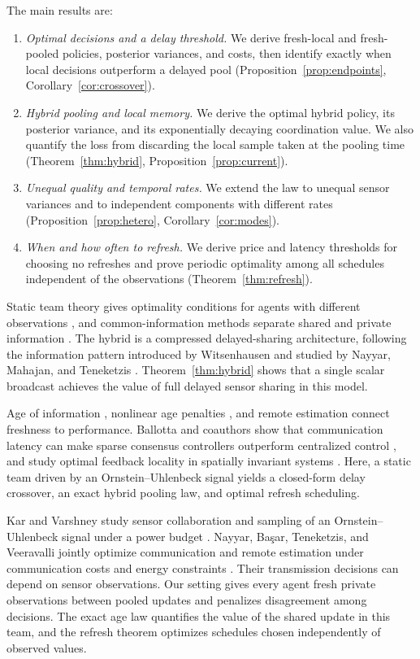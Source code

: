 \documentclass[letterpaper,10pt,conference]{ieeeconf}
\begin{document}
The main results are:
\begin{enumerate}
\item \emph{Optimal decisions and a delay threshold.} We derive fresh-local and fresh-pooled policies, posterior variances, and costs, then identify exactly when local decisions outperform a delayed pool (Proposition~\ref{prop:endpoints}, Corollary~\ref{cor:crossover}).
\item \emph{Hybrid pooling and local memory.} We derive the optimal hybrid policy, its posterior variance, and its exponentially decaying coordination value. We also quantify the loss from discarding the local sample taken at the pooling time (Theorem~\ref{thm:hybrid}, Proposition~\ref{prop:current}).
\item \emph{Unequal quality and temporal rates.} We extend the law to unequal sensor variances and to independent components with different rates (Proposition~\ref{prop:hetero}, Corollary~\ref{cor:modes}).
\item \emph{When and how often to refresh.} We derive price and latency thresholds for choosing no refreshes and prove periodic optimality among all schedules independent of the observations (Theorem~\ref{thm:refresh}).
\end{enumerate}
Static team theory gives optimality conditions for agents with different observations \cite{radner1962team}, and common-information methods separate shared and private information \cite{afshari2017static}. The hybrid is a compressed delayed-sharing architecture, following the information pattern introduced by Witsenhausen \cite{witsenhausen1971separation} and studied by Nayyar, Mahajan, and Teneketzis \cite{nayyar2011sharing}. Theorem~\ref{thm:hybrid} shows that a single scalar broadcast achieves the value of full delayed sensor sharing in this model.

Age of information \cite{yates2021aoi}, nonlinear age penalties \cite{sun2017update}, and remote estimation \cite{ornee2021ou} connect freshness to performance. Ballotta and coauthors show that communication latency can make sparse consensus controllers outperform centralized control \cite{ballotta2023latency}, and study optimal feedback locality in spatially invariant systems \cite{ballotta2026role}. Here, a static team driven by an Ornstein--Uhlenbeck signal yields a closed-form delay crossover, an exact hybrid pooling law, and optimal refresh scheduling.

Kar and Varshney study sensor collaboration and sampling of an Ornstein--Uhlenbeck signal under a power budget \cite{kar2012controlled}. Nayyar, Ba\c{s}ar, Teneketzis, and Veeravalli jointly optimize communication and remote estimation under communication costs and energy constraints \cite{nayyar2013optimal}. Their transmission decisions can depend on sensor observations. Our setting gives every agent fresh private observations between pooled updates and penalizes disagreement among decisions. The exact age law quantifies the value of the shared update in this team, and the refresh theorem optimizes schedules chosen independently of observed values.
\end{document}
